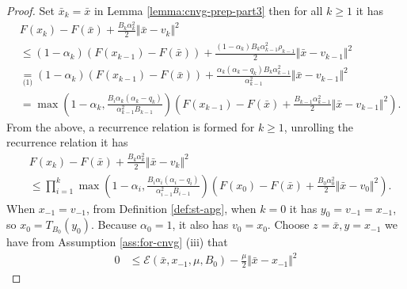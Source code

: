\documentclass[12pt]{article}
\begin{document}
        \begin{proof}
            Set $\bar x_k = \bar x$ in Lemma \ref{lemma:cnvg-prep-part3} then for all $k\ge 1$ it has 
            \begin{align*}
                & F(x_k) - F(\bar x) + \frac{B_k\alpha_k^2}{2}\Vert \bar x- v_k\Vert^2 
                \\
                &\le \left(
                    1 - \alpha_k
                \right)(F(x_{k- 1}) - F(\bar x))
                + \frac{(1 - \alpha_k)B_k\alpha_{k -1}^2 \rho_{k - 1}}{2}\Vert \bar x - v_{k - 1}\Vert^2
                \\
                &\underset{\text{(1)}}{=} 
                \left(
                    1 - \alpha_k
                \right)(F(x_{k- 1}) - F(\bar x))
                + \frac{\alpha_k(\alpha_k - q_k)B_k\alpha_{k - 1}^2}{\alpha_{k - 1}^2}\Vert \bar x - v_{k - 1}\Vert^2
                \\
                &= \max\left(
                    1 - \alpha_k, 
                    \frac{B_i\alpha_k(\alpha_k - q_k)}{\alpha_{k - 1}^2B_{k - 1}}
                \right)
                \left(
                    F(x_{k - 1}) - F(\bar x)
                    + \frac{B_{k - 1}\alpha_{k - 1}^2}{2}\Vert \bar x - v_{k - 1}\Vert^2
                \right). 
            \end{align*}
            From the above, a recurrence relation is formed for $k \ge 1$, unrolling the recurrence relation it has 
            \begin{align*}
                & F(x_k) - F(\bar x) + \frac{B_k\alpha_k^2}{2}\Vert \bar x- v_k\Vert^2 
                \\&\le 
                \prod_{i = 1}^k\max\left(
                    1 - \alpha_i, 
                    \frac{B_i\alpha_i(\alpha_i - q_i)}{\alpha_{i - 1}^2B_{i - 1}}
                \right)
                \left(
                    F(x_0) - F(\bar x)
                    + \frac{B_0\alpha_0^2}{2}\Vert \bar x - v_0\Vert^2
                \right). 
            \end{align*}
            When $x_{-1} = v_{-1}$, from Definition \ref{def:st-apg}, when $k = 0$ it has $y_0 = v_{-1} = x_{-1}$, so $x_0 = T_{B_0}(y_0)$. 
            Because $\alpha_0 = 1$, it also has $v_0 = x_0$. 
            Choose $z = \bar x, y = x_{-1}$ we have from Assumption \ref{ass:for-cnvg} (iii) that
            \begin{align*}
                0 &\le \mathcal E(\bar x, x_{-1}, \mu, B_0) - \frac{\mu}{2}\Vert \bar x - x_{-1}\Vert^2

\end{align*}
\end{proof}
\end{document}
